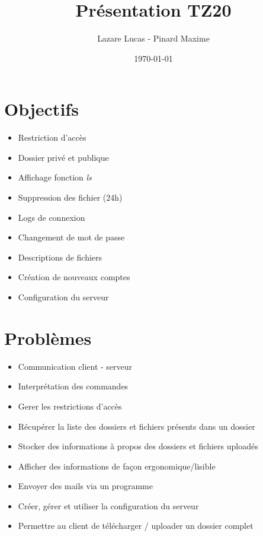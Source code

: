 \documentclass[11pt]{beamer}
\author{Lazare Lucas - Pinard Maxime}
\title{Présentation TZ20}
\institute{UTBM}
\date{\today}
\begin{document}
\begin{frame}
	\titlepage{}
\end{frame}

\begin{frame}
	\tableofcontents{}
\end{frame}

\section{Objectifs}

	\begin{frame}
		\begin{itemize}
			\item{} Restriction d'accès
			\item{} Dossier privé et publique
			\item{} Affichage fonction \textit{ls}
			\item{} Suppression des fichier (24h)
			\item{} Logs de connexion
			\item{} Changement de mot de passe
			\item{} Descriptions de fichiers
			\item{} Création de nouveaux comptes
			\item{} Configuration du serveur
		\end{itemize}
	\end{frame}

\section{Problèmes}

	\begin{frame}
		\begin{itemize}
			\item{} Communication client - serveur
			\item{} Interprétation des commandes
			\item{} Gerer les restrictions d'accès
			\item{} Récupérer la liste des dossiers et fichiers présents dans un dossier
			\item{} Stocker des informations à propos des dossiers et fichiers uploadés
			\item{} Afficher des informations de façon ergonomique/lisible
			\item{} Envoyer des mails via un programme
			\item{} Créer, gérer et utiliser la configuration du serveur
			\item{} Permettre au client de télécharger / uploader un dossier complet
		\end{itemize}
	\end{frame}
\end{document}
